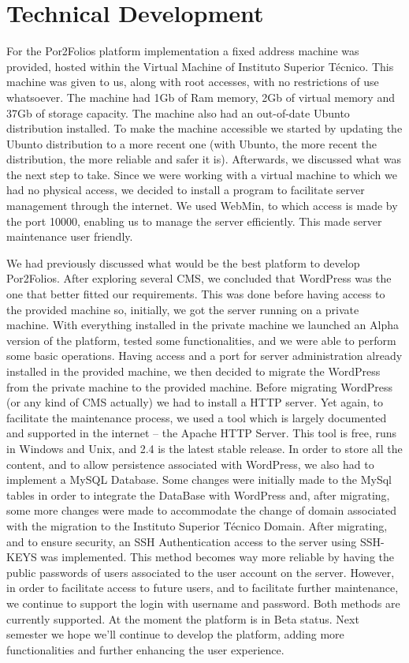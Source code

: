 \documentclass[a4paper,12pt,journal,twoside,compsoc]{PPIEEEtran}
\begin{document}
\section{Technical Development}
For the Por2Folios platform implementation a fixed address machine was provided, hosted within the Virtual Machine of Instituto Superior Técnico. This machine was given to us, along with root accesses, with no restrictions of use whatsoever. The machine had 1Gb of Ram memory, 2Gb of virtual memory and 37Gb of storage capacity. The machine also had an out-of-date Ubunto distribution installed. To make the machine accessible we started by updating the Ubunto distribution to a more recent one (with Ubunto, the more recent the distribution, the more reliable and safer it is). Afterwards, we discussed what was the next step to take. Since we were working with a virtual machine to which we had no physical access, we decided to install a program to facilitate server management through the internet.  We used WebMin, to which access is made by the port 10000, enabling us to manage the server efficiently. This made server maintenance user friendly.

We had previously discussed what would be the best platform to develop Por2Folios. After exploring several \ac{CMS}, we concluded that WordPress was the one that better fitted our requirements. This was done before having access to the provided machine so, initially, we got the server running on a private machine. With everything installed in the private machine we launched an Alpha version of the platform, tested some functionalities, and we were able to perform some basic operations.
Having access and a port for server administration already installed in the provided machine, we then decided to migrate the WordPress from the private machine to the provided machine.
Before migrating WordPress (or any kind of \ac{CMS} actually) we had to install a HTTP server. Yet again, to facilitate the maintenance process, we used a tool which is largely documented and supported in the internet -- the Apache HTTP Server. This tool is free, runs in Windows and Unix, and 2.4 is the latest stable release. 
In order to store all the content, and to allow persistence associated with WordPress, we also had to implement a MySQL Database. Some changes were initially made to the MySql tables in order to integrate the DataBase with WordPress and, after migrating, some more changes were made to accommodate the change of domain associated with the migration to the Instituto Superior Técnico Domain.
After migrating, and to ensure security, an SSH Authentication access to the server using SSH-KEYS was implemented. This method becomes way more reliable by having the public passwords of users associated to the user account on the server. However, in order to facilitate access to future users, and to facilitate further maintenance, we continue to support the login with username and password. Both methods are currently supported.
At the moment the platform is in Beta status. Next semester we hope we'll continue to develop the platform, adding more functionalities and further enhancing the user experience.
\end{document}
